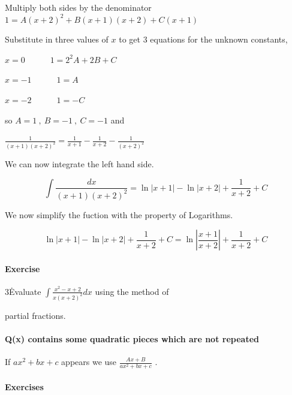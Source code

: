 Multiply both sides by the denominator $1=A(x+2)^2+B(x+1)(x+2)+C(x+1)$



Substitute in three values of $x$ to get 3 equations for the unknown constants,



$x=0 \quad\quad\quad 1=2^2A+2B+C$



$x=-1 \quad\quad\quad 1=A$



$x=-2 \quad\quad\quad 1=-C$



so $A=1\ ,\ B=-1\ ,\ C=-1$ and



$\frac{1}{(x+1)(x+2)^2}=\frac{1}{x+1}-\frac{1}{x+2}-\frac{1}{(x+2)^2}$



We can now integrate the left hand side.



$$\int\frac{dx}{(x+1)(x+2)^2}=\ln\left|x+1\right|-\ln\left|x+2\right|+\frac{1}{x+2}+C$$

We now simplify the fuction with the property of Logarithms.



$$\ln\left|x+1\right|-\ln\left|x+2\right|+\frac{1}{x+2}+C=\ln\left|\frac{x+1}{x+2}\right|+\frac{1}{x+2}+C$$



\paragraph{Exercise}



3\. Evaluate $\int\frac{x^2-x+2}{x(x+2)^2}dx$ using the method of

partial fractions.



\paragraph{Q(x) contains some quadratic pieces which are not repeated}



If $ax^2+bx+c$ appears we use $\frac{Ax+B}{ax^2+bx+c}$ .



\paragraph{Exercises}



